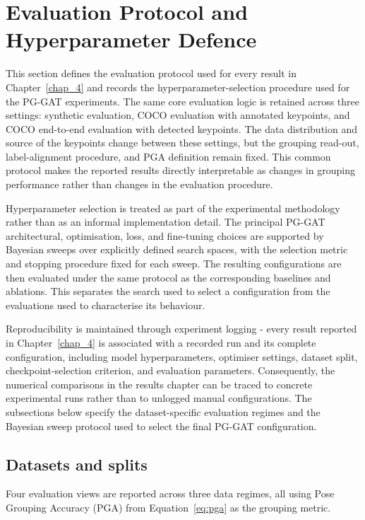 \section{Evaluation Protocol and Hyperparameter Defence}
\label{sec_meth_evaluation}

This section defines the evaluation protocol used for every result in
Chapter~\ref{chap_4}
and records the hyperparameter-selection procedure used for the PG-GAT experiments.
The same core evaluation logic is retained across three settings:
synthetic evaluation,
COCO evaluation with annotated keypoints,
and COCO end-to-end evaluation with detected keypoints.
The data distribution and source of the keypoints change between these settings,
but the grouping read-out,
label-alignment procedure,
and PGA definition remain fixed.
This common protocol makes the reported results directly interpretable
as changes in grouping performance
rather than changes in the evaluation procedure.

Hyperparameter selection is treated as part of the experimental
methodology
rather than as an informal implementation detail.
The principal PG-GAT architectural,
optimisation,
loss,
and fine-tuning choices are supported by Bayesian sweeps
over explicitly defined search spaces,
with the selection metric and stopping procedure fixed for each sweep.
The resulting configurations are then evaluated under the same protocol
as the corresponding baselines and ablations.
This separates the search used to select a configuration
from the evaluations used to characterise its behaviour.

Reproducibility is maintained through experiment logging -
every result reported in Chapter~\ref{chap_4} is associated
with a recorded run and its complete configuration,
including model hyperparameters,
optimiser settings,
dataset split,
checkpoint-selection criterion,
and evaluation parameters.
Consequently,
the numerical comparisons in the results chapter can be traced
to concrete experimental runs
rather than to unlogged manual configurations.
The subsections below specify the dataset-specific evaluation regimes
and the Bayesian sweep protocol used to select the final PG-GAT configuration.

\subsection{Datasets and splits}
\label{sec_meth_evaluation_splits}

Four evaluation views are reported across three data regimes,
all using Pose Grouping Accuracy (PGA) from Equation~\eqref{eq:pga}
as the grouping metric.

